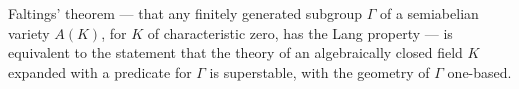 Faltings' theorem --- that any finitely generated subgroup $\Gamma$ of a semiabelian variety $A(K)$, for $K$ of characteristic zero, has the Lang property --- is equivalent to the statement that the theory of an algebraically closed field $K$ expanded with a predicate for $\Gamma$ is superstable, with the geometry of $\Gamma$ one-based.
